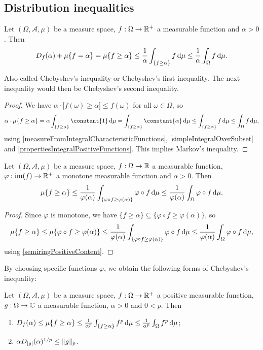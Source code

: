 \subsection{Distribution inequalities}
\begin{proposition}
Let $(\Omega, \mathcal{A}, \mu)$ be a measure space, $f:\Omega\to \mathbb{R}^+$ a measurable function and $\alpha>0$. Then
\[ D_f(\alpha) + \mu\{f = \alpha\} = \mu\{f\geq \alpha\} \leq \frac{1}{\alpha}\int_{\{f\geq \alpha\}}f\operatorname{d \!}{\mu} \leq \frac{1}{\alpha}\int_\Omega f\operatorname{d \!}{\mu}. \]
\end{proposition}
Also called Chebyshev's inequality or Chebyshev's first inequality. The next inequality would then be Chebyshev's second inequality. 
\begin{proof}
We have $\alpha\cdot \big[f(\omega)\geq \alpha\big]\leq f(\omega)$ for all $\omega\in\Omega$, so
\[ \alpha\cdot \mu\{f\geq \alpha\} = \alpha \int_{\{f\geq \alpha\}}\constant{1}\diff{\mu} = \int_{\{f\geq \alpha\}}\constant{\alpha}\diff{\mu} \leq \int_{\{f\geq \alpha\}}f\diff{\mu} \leq \int_\Omega f\diff{\mu}, \]
using \ref{measureFromIntegralCharacteristicFunctions}, \ref{simpleIntegralOverSubset} and \ref{propertiesIntegralPositiveFunctions}. This implies Markov's inequality.
\end{proof}
\begin{corollary}
Let $(\Omega, \mathcal{A}, \mu)$ be a measure space, $f:\Omega\to\mathbb{R}$ a measurable function, $\varphi:\operatorname{im}(f) \to \mathbb{R}^+$ a monotone measurable function and $\alpha>0$. Then
\[ \mu\{f\geq \alpha\} \leq \frac{1}{\varphi(\alpha)}\int_{\{\varphi\circ f \geq \varphi(\alpha)\}} \varphi\circ f\operatorname{d \!}{\mu} \leq \frac{1}{\varphi(\alpha)}\int_\Omega \varphi\circ f\operatorname{d \!}{\mu}. \]
\end{corollary}
\begin{proof}
Since $\varphi$ is monotone, we have $\{f\geq \alpha\} \subseteq \{\varphi\circ f\geq \varphi(\alpha)\}$, so
\[ \mu\{f\geq \alpha\} \leq \mu\{\varphi\circ f\geq \varphi(\alpha)\} \leq \frac{1}{\varphi(\alpha)}\int_{\{\varphi\circ f \geq \varphi(\alpha)\}} \varphi\circ f\operatorname{d \!}{\mu} \leq \frac{1}{\varphi(\alpha)}\int_\Omega \varphi\circ f\operatorname{d \!}{\mu}, \]
using \ref{semiringPositiveContent}.
\end{proof}
By choosing specific functions $\varphi$, we obtain the following forms of Chebyshev's inequality:
\begin{corollary} \label{ChebyshevInequalityCorollary}
Let $(\Omega, \mathcal{A}, \mu)$ be a measure space, $f:\Omega\to\mathbb{R}^+$ a positive measurable function, $g: \Omega\to \mathbb{C}$ a measurable function, $\alpha>0$ and $0<p$. Then
\begin{enumerate}
\item $D_f(\alpha) \leq \mu\{f\geq \alpha\} \leq \frac{1}{\alpha^p}\int_{\{f \geq \alpha\}} f^p\operatorname{d \!}{\mu} \leq \frac{1}{\alpha^p}\int_\Omega f^p\operatorname{d \!}{\mu}$;
\item $\alpha D_{|g|}(\alpha)^{1/p}\leq \lVert g\rVert_p$.
\end{enumerate}
\end{corollary}
